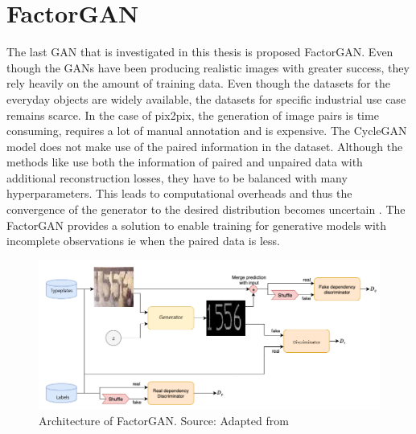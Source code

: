 \section{FactorGAN}
The last GAN that is investigated in this thesis is \cite{stoller2019training} proposed FactorGAN. Even though the GANs have been producing realistic images with greater success, they rely heavily on the amount of training data. Even though the datasets for the everyday objects are widely available, the datasets for specific industrial use case remains scarce. In the case of pix2pix, the generation of image pairs is time consuming, requires a lot of manual annotation and is expensive. The CycleGAN model does not make use of the paired information in the dataset. Although the methods like \citep{tripathy2018learning,almahairi2018augmented} use both the information of paired and unpaired data with additional reconstruction losses, they have to be balanced with many hyperparameters. This leads to computational overheads and thus the convergence of the generator to the desired distribution becomes uncertain \citep{stoller2019training}. The FactorGAN provides a solution to enable training for generative models with incomplete observations ie when the paired data is less.
\begin{figure}[H]
\centering
\includegraphics[width=5in]{images/factorgan.PNG}
\caption[Architecture of FactorGAN]{Architecture of FactorGAN. Source: Adapted from \citep{factgit}}
\label{fig:factorgan}
\end{figure}
